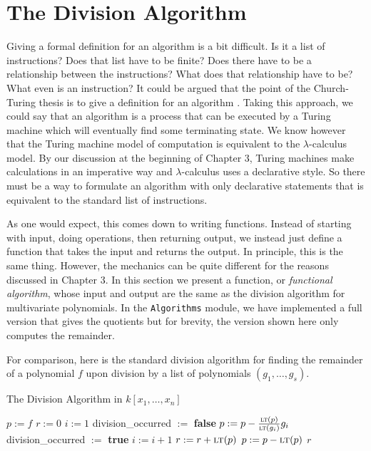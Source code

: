 \documentclass[MS, xcolor=dvipsnames]{wfuthesis}
\newcommand{\LT}{\ensuremath{\text{\sc lt}}}
\theoremstyle{definition}
\begin{document}
\section{The Division Algorithm}
Giving a formal definition for an algorithm is a bit difficult. Is it a list of instructions? Does that list have to be finite? Does there have to be a relationship between the instructions? What does that relationship have to be? What even is an instruction? It could be argued that the point of the Church-Turing thesis is to give a definition for an algorithm \cite{Kleene1952}. Taking this approach, we could say that an algorithm is a process that can be executed by a Turing machine which will eventually find some terminating state. We know however that the Turing machine model of computation is equivalent to the $\lambda$-calculus model. By our discussion at the beginning of Chapter 3, Turing machines make calculations in an imperative way and $\lambda$-calculus uses a declarative style. So there must be a way to formulate an algorithm with only declarative statements that is equivalent to the standard list of instructions. \par
As one would expect, this comes down to writing functions. Instead of starting with input, doing operations, then returning output, we instead just define a function that takes the input and returns the output. In principle, this is the same thing. However, the mechanics can be quite different for the reasons discussed in Chapter 3. In this section we present a function, or \emph{functional algorithm}, whose input and output are the same as the division algorithm for multivariate polynomials. In the \lstinline{Algorithms} module, we have implemented a full version that gives the quotients but for brevity, the version shown here only computes the remainder. \par
For comparison, here is the standard division algorithm for finding the remainder of a polynomial $f$ upon division by a list of polynomials $(g_1,\dots,g_s)$. \par
\begin{algorithm}
\caption{The Division Algorithm in $k[x_1,\dots,x_n]$}
\begin{algorithmic}
  \State $p:= f$
  \State $r:= 0$
    \State $i:= 1$
    \State division\_occurred $:=$ \textbf{false}
      \If{($\LT(g_i)$ divides $\LT(p)$)}
        \State $p := p - \frac{\LT(p)}{\LT(g_i)}g_i$
        \State division\_occurred $:=$ \textbf{true}
      \Else
        \State $i:= i+1$
      \EndIf
    \EndWhile
      \State $r := r + \LT(p)$
      \State $p := p - \LT(p)$
    \EndIf
  \EndWhile
  \State \Return $r$
\end{algorithmic}
\end{algorithm}
\end{document}
